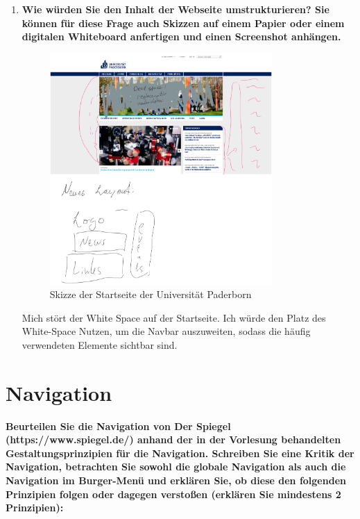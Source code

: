 \documentclass[a4paper,12pt]{article}
\begin{document}
\begin{enumerate}[label=\alph*)]
  \item \textbf{Wie würden Sie den Inhalt der Webseite umstrukturieren? Sie können für
          diese Frage auch Skizzen auf einem Papier oder einem digitalen Whiteboard
          anfertigen und einen Screenshot anhängen.}

        \begin{figure}
          \centering
          \includegraphics[width=0.8\textwidth]{./2023-05-08-4P5owdQYFDNH4AAAAASUVORK5CYII.png}
          \caption{Skizze der Startseite der Universität Paderborn}
        \end{figure}

        Mich stört der White Space auf der Startseite. Ich würde den Platz des
        White-Space Nutzen, um die Navbar auszuweiten, sodass die häufig
        verwendeten Elemente sichtbar sind.
\end{enumerate}


\section{Navigation}
\textbf{Beurteilen Sie die Navigation von Der Spiegel (https://www.spiegel.de/)
  anhand der in der Vorlesung behandelten Gestaltungsprinzipien für die
  Navigation. Schreiben Sie eine Kritik der Navigation, betrachten Sie
  sowohl die globale Navigation als auch die Navigation im Burger-Menü und
  erklären Sie, ob diese den folgenden Prinzipien folgen oder dagegen
  verstoßen (erklären Sie mindestens 2 Prinzipien):}
\end{document}
